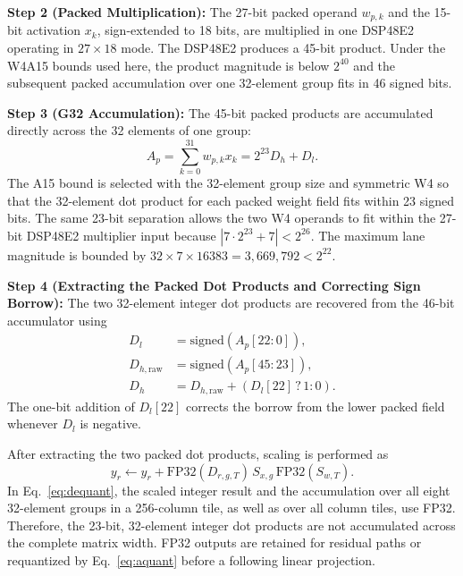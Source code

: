 \documentclass[conference]{IEEEtran}
\begin{document}
\textbf{Step 2 (Packed Multiplication):}
The 27-bit packed operand $w_{p,k}$ and the 15-bit activation $x_k$,
sign-extended to 18 bits, are multiplied in one DSP48E2 operating in
$27\times18$ mode. The DSP48E2 produces a 45-bit product. Under the W4A15
bounds used here, the product magnitude is below $2^{40}$ and the subsequent
packed accumulation over one 32-element group fits in 46 signed bits.

\textbf{Step 3 (G32 Accumulation):}
The 45-bit packed products are accumulated directly across the 32 elements of
one group:
\begin{equation}
 A_p=\sum_{k=0}^{31} w_{p,k} x_k
     =2^{23}D_h+D_l .
 \label{eq:packedacc}
\end{equation}
The A15 bound is selected with the 32-element group size and symmetric W4 so
that the 32-element dot product for each packed weight field fits within 23
signed bits. The same 23-bit separation allows the two W4 operands to fit
within the 27-bit DSP48E2 multiplier input because
$|7\cdot2^{23}+7|<2^{26}$. The maximum lane magnitude is bounded by
$32\times7\times16383=3{,}669{,}792<2^{22}$.

\textbf{Step 4 (Extracting the Packed Dot Products and Correcting Sign Borrow):}
The two 32-element integer dot products are recovered from the 46-bit
accumulator using
\begin{align}
 D_l &= \mathrm{signed}(A_p[22:0]),\\
 D_{h,\mathrm{raw}} &= \mathrm{signed}(A_p[45:23]),\\
 D_h &= D_{h,\mathrm{raw}} + \left(D_l[22]\, ?\, 1 : 0\right).
 \label{eq:correction}
\end{align}
The one-bit addition of $D_l[22]$ corrects the borrow from the lower packed
field whenever $D_l$ is negative.

After extracting the two packed dot products, scaling is performed as
\begin{equation}
 y_r \leftarrow y_r +
 \mathrm{FP32}(D_{r,g,T})\,S_{x,g}\,
 \mathrm{FP32}(S_{w,T}).
 \label{eq:dequant}
\end{equation}
In Eq.~\eqref{eq:dequant}, the scaled integer result and the accumulation over
all eight 32-element groups in a 256-column tile, as well as over all column
tiles, use FP32. Therefore, the 23-bit, 32-element integer dot products are not
accumulated across the complete matrix width. FP32 outputs are retained for
residual paths or requantized by Eq.~\eqref{eq:aquant} before a following
linear projection.
\end{document}

